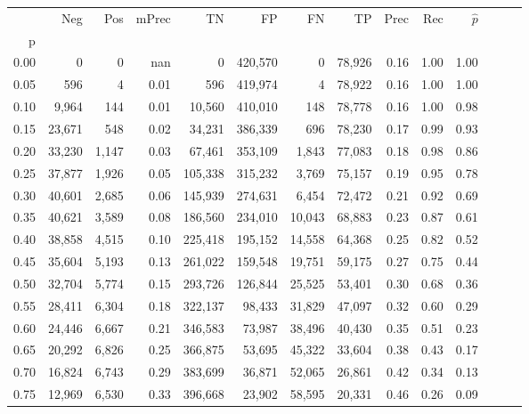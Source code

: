 \begin{tabular}{rrrrrrrrrrrrrr}
\toprule
{} &     Neg &    Pos & mPrec &       TN &       FP &      FN &      TP &  Prec &   Rec & $\hat{p}$ \\
p    &         &        &       &          &          &         &         &       &       &           \\
\midrule
0.00 &       0 &      0 &   nan &        0 &  420,570 &       0 &  78,926 &  0.16 &  1.00 &      1.00 \\
0.05 &     596 &      4 &  0.01 &      596 &  419,974 &       4 &  78,922 &  0.16 &  1.00 &      1.00 \\
0.10 &   9,964 &    144 &  0.01 &   10,560 &  410,010 &     148 &  78,778 &  0.16 &  1.00 &      0.98 \\
0.15 &  23,671 &    548 &  0.02 &   34,231 &  386,339 &     696 &  78,230 &  0.17 &  0.99 &      0.93 \\
0.20 &  33,230 &  1,147 &  0.03 &   67,461 &  353,109 &   1,843 &  77,083 &  0.18 &  0.98 &      0.86 \\
0.25 &  37,877 &  1,926 &  0.05 &  105,338 &  315,232 &   3,769 &  75,157 &  0.19 &  0.95 &      0.78 \\
0.30 &  40,601 &  2,685 &  0.06 &  145,939 &  274,631 &   6,454 &  72,472 &  0.21 &  0.92 &      0.69 \\
0.35 &  40,621 &  3,589 &  0.08 &  186,560 &  234,010 &  10,043 &  68,883 &  0.23 &  0.87 &      0.61 \\
0.40 &  38,858 &  4,515 &  0.10 &  225,418 &  195,152 &  14,558 &  64,368 &  0.25 &  0.82 &      0.52 \\
0.45 &  35,604 &  5,193 &  0.13 &  261,022 &  159,548 &  19,751 &  59,175 &  0.27 &  0.75 &      0.44 \\
0.50 &  32,704 &  5,774 &  0.15 &  293,726 &  126,844 &  25,525 &  53,401 &  0.30 &  0.68 &      0.36 \\
0.55 &  28,411 &  6,304 &  0.18 &  322,137 &   98,433 &  31,829 &  47,097 &  0.32 &  0.60 &      0.29 \\
0.60 &  24,446 &  6,667 &  0.21 &  346,583 &   73,987 &  38,496 &  40,430 &  0.35 &  0.51 &      0.23 \\
0.65 &  20,292 &  6,826 &  0.25 &  366,875 &   53,695 &  45,322 &  33,604 &  0.38 &  0.43 &      0.17 \\
0.70 &  16,824 &  6,743 &  0.29 &  383,699 &   36,871 &  52,065 &  26,861 &  0.42 &  0.34 &      0.13 \\
0.75 &  12,969 &  6,530 &  0.33 &  396,668 &   23,902 &  58,595 &  20,331 &  0.46 &  0.26 &      0.09 \\

\end{tabular}
